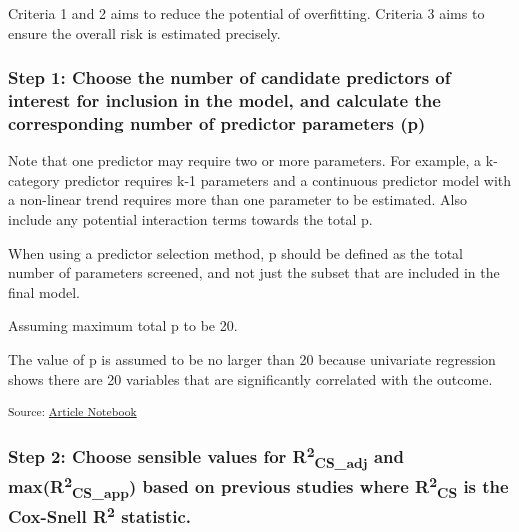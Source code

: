 \documentclass[
  letterpaper,
  DIV=11,
  numbers=noendperiod]{scrartcl}
\begin{document}
Criteria 1 and 2 aims to reduce the potential of overfitting. Criteria 3
aims to ensure the overall risk is estimated precisely.

\subsubsection{Step 1: Choose the number of candidate predictors of
interest for inclusion in the model, and calculate the corresponding
number of predictor parameters
(p)}\label{step-1-choose-the-number-of-candidate-predictors-of-interest-for-inclusion-in-the-model-and-calculate-the-corresponding-number-of-predictor-parameters-p}

Note that one predictor may require two or more parameters. For example,
a k-category predictor requires k-1 parameters and a continuous
predictor model with a non-linear trend requires more than one parameter
to be estimated. Also include any potential interaction terms towards
the total p.

When using a predictor selection method, p should be defined as the
total number of parameters screened, and not just the subset that are
included in the final model.

Assuming maximum total p to be 20.

\begin{tcolorbox}[enhanced jigsaw, titlerule=0mm, rightrule=.15mm, colbacktitle=quarto-callout-note-color!10!white, toprule=.15mm, opacitybacktitle=0.6, colframe=quarto-callout-note-color-frame, bottomrule=.15mm, toptitle=1mm, breakable, colback=white, bottomtitle=1mm, left=2mm, leftrule=.75mm, coltitle=black, title=\textcolor{quarto-callout-note-color}{\faInfo}\hspace{0.5em}{Note}, arc=.35mm, opacityback=0]

The value of p is assumed to be no larger than 20 because univariate
regression shows there are 20 variables that are significantly
correlated with the outcome.

\end{tcolorbox}

\textsubscript{Source:
\href{https://AnTangQuoc.github.io/LZD-TP-pred-model/index.qmd.html}{Article
Notebook}}

\subsubsection{\texorpdfstring{Step 2: Choose sensible values for
R\textsuperscript{2}\textsubscript{CS\_adj} and
max(R\textsuperscript{2}\textsubscript{CS\_app}) based on previous
studies where R\textsuperscript{2}\textsubscript{CS} is the Cox-Snell
R\textsuperscript{2}
statistic.}{Step 2: Choose sensible values for R2CS\_adj and max(R2CS\_app) based on previous studies where R2CS is the Cox-Snell R2 statistic.}}\label{step-2-choose-sensible-values-for-r2cs_adj-and-maxr2cs_app-based-on-previous-studies-where-r2cs-is-the-cox-snell-r2-statistic.}
\end{document}

